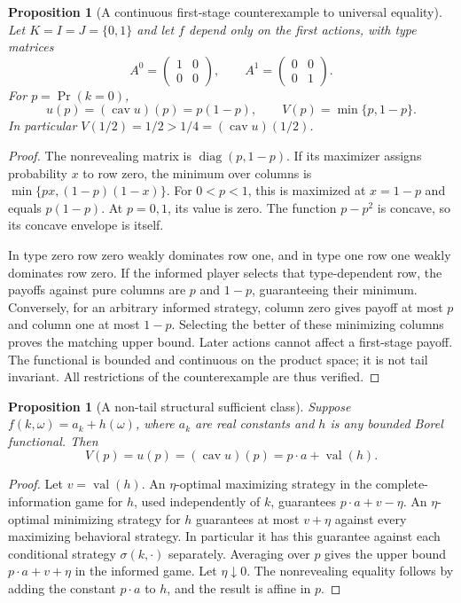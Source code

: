 \documentclass[11pt,a4paper]{article}
\newtheorem{proposition}[theorem]{Proposition}
\theoremstyle{definition}
\theoremstyle{remark}
\begin{document}
\begin{proposition}[A continuous first-stage counterexample to universal equality]
Let $K=I=J=\{0,1\}$ and let $f$ depend only on the first actions, with type matrices
\[
 A^0=\begin{pmatrix}1&0\\0&0\end{pmatrix},\qquad
 A^1=\begin{pmatrix}0&0\\0&1\end{pmatrix}.
\]
For $p=\Pr(k=0)$,
\[
 u(p)=(\operatorname{cav}u)(p)=p(1-p),\qquad
 V(p)=\min\{p,1-p\}.
\]
In particular $V(1/2)=1/2>1/4=(\operatorname{cav}u)(1/2)$.
\end{proposition}
\begin{proof}
The nonrevealing matrix is $\operatorname{diag}(p,1-p)$. If its maximizer assigns probability $x$ to row zero, the minimum over columns is $\min\{px,(1-p)(1-x)\}$. For $0<p<1$, this is maximized at $x=1-p$ and equals $p(1-p)$. At $p=0,1$, its value is zero. The function $p-p^2$ is concave, so its concave envelope is itself.

In type zero row zero weakly dominates row one, and in type one row one weakly dominates row zero. If the informed player selects that type-dependent row, the payoffs against pure columns are $p$ and $1-p$, guaranteeing their minimum. Conversely, for an arbitrary informed strategy, column zero gives payoff at most $p$ and column one at most $1-p$. Selecting the better of these minimizing columns proves the matching upper bound. Later actions cannot affect a first-stage payoff. The functional is bounded and continuous on the product space; it is not tail invariant. All restrictions of the counterexample are thus verified.
\end{proof}

\begin{proposition}[A non-tail structural sufficient class]
Suppose $f(k,\omega)=a_k+h(\omega)$, where $a_k$ are real constants and $h$ is any bounded Borel functional. Then
\[
 V(p)=u(p)=(\operatorname{cav}u)(p)=p\cdot a+\operatorname{val}(h).
\]
\end{proposition}
\begin{proof}
Let $v=\operatorname{val}(h)$. An $\eta$-optimal maximizing strategy in the complete-information game for $h$, used independently of $k$, guarantees $p\cdot a+v-\eta$. An $\eta$-optimal minimizing strategy for $h$ guarantees at most $v+\eta$ against every maximizing behavioral strategy. In particular it has this guarantee against each conditional strategy $\sigma(k,\cdot)$ separately. Averaging over $p$ gives the upper bound $p\cdot a+v+\eta$ in the informed game. Let $\eta\downarrow0$. The nonrevealing equality follows by adding the constant $p\cdot a$ to $h$, and the result is affine in $p$.
\end{proof}
\end{document}
